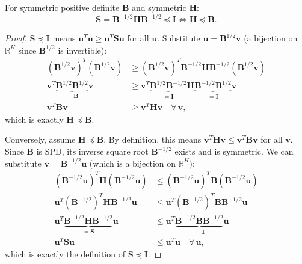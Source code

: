 \begin{lemma}
\label{app:lem:SpreI}
For symmetric positive definite $\mathbf{B}$ and symmetric $\mathbf{H}$:
\[
    \mathbf{S} = \mathbf{B}^{-1/2}\mathbf{H}\mathbf{B}^{-1/2} \preceq \mathbf{I}
    \iff
    \mathbf{H} \preceq \mathbf{B}.
\]
\end{lemma}
\begin{proof}
$\mathbf{S}\preceq\mathbf{I}$ means $\mathbf{u}^T\mathbf{u}\ge\mathbf{u}^T\mathbf{S}\mathbf{u}$ for all $\mathbf{u}$.
Substitute $\mathbf{u}=\mathbf{B}^{1/2}\mathbf{v}$ (a bijection on $\mathbb{R}^H$ since $\mathbf{B}^{1/2}$ is invertible):
\begin{align*}
    (\mathbf{B}^{1/2}\mathbf{v})^T(\mathbf{B}^{1/2}\mathbf{v})
    &\ge
    (\mathbf{B}^{1/2}\mathbf{v})^T
    \mathbf{B}^{-1/2}\mathbf{H}\mathbf{B}^{-1/2}
    (\mathbf{B}^{1/2}\mathbf{v}) \\[4pt]
    \mathbf{v}^T\underbrace{\mathbf{B}^{1/2}\mathbf{B}^{1/2}}_{=\mathbf{B}}\mathbf{v}
    &\ge
    \mathbf{v}^T\underbrace{\mathbf{B}^{1/2}\mathbf{B}^{-1/2}}_{=\mathbf{I}}\mathbf{H}
    \underbrace{\mathbf{B}^{-1/2}\mathbf{B}^{1/2}}_{=\mathbf{I}}\mathbf{v} \\[4pt]
    \mathbf{v}^T\mathbf{B}\mathbf{v} &\ge \mathbf{v}^T\mathbf{H}\mathbf{v} \quad\forall\,\mathbf{v},
\end{align*}
which is exactly $\mathbf{H}\preceq\mathbf{B}$.

Conversely, assume $\mathbf{H} \preceq \mathbf{B}$. By definition, this means $\mathbf{v}^T\mathbf{H}\mathbf{v} \le \mathbf{v}^T\mathbf{B}\mathbf{v}$ for all $\mathbf{v}$. 
Since $\mathbf{B}$ is SPD, its inverse square root $\mathbf{B}^{-1/2}$ exists and is symmetric. We can substitute $\mathbf{v} = \mathbf{B}^{-1/2}\mathbf{u}$ (which is a bijection on $\mathbb{R}^H$):
\begin{align*}
    (\mathbf{B}^{-1/2}\mathbf{u})^T \mathbf{H} (\mathbf{B}^{-1/2}\mathbf{u}) 
    &\le 
    (\mathbf{B}^{-1/2}\mathbf{u})^T \mathbf{B} (\mathbf{B}^{-1/2}\mathbf{u}) \\[4pt]
    \mathbf{u}^T (\mathbf{B}^{-1/2})^T \mathbf{H} \mathbf{B}^{-1/2} \mathbf{u} 
    &\le 
    \mathbf{u}^T (\mathbf{B}^{-1/2})^T \mathbf{B} \mathbf{B}^{-1/2} \mathbf{u} \\[4pt]
    \mathbf{u}^T \underbrace{\mathbf{B}^{-1/2} \mathbf{H} \mathbf{B}^{-1/2}}_{=\mathbf{S}} \mathbf{u} 
    &\le 
    \mathbf{u}^T \underbrace{\mathbf{B}^{-1/2} \mathbf{B} \mathbf{B}^{-1/2}}_{=\mathbf{I}} \mathbf{u} \\[4pt]
    \mathbf{u}^T \mathbf{S} \mathbf{u} &\le \mathbf{u}^T \mathbf{u} \quad \forall\,\mathbf{u},
\end{align*}
which is exactly the definition of $\mathbf{S} \preceq \mathbf{I}$.
\end{proof}


